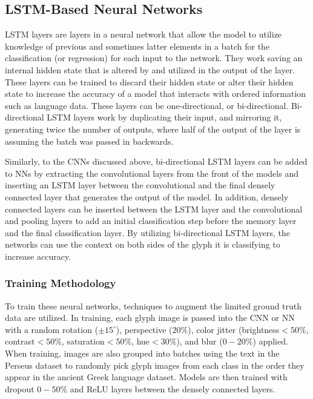 \subsection{LSTM-Based Neural Networks}

LSTM layers are layers in a neural network that allow the model to utilize knowledge of previous and sometimes latter elements in a batch for the classification (or regression) for each input to the network. They work saving an internal hidden state that is altered by and utilized in the output of the layer. These layers can be trained to discard their hidden state or alter their hidden state to increase the accuracy of a model that interacts with ordered information such as language data. These layers can be one-directional, or bi-directional. Bi-directional LSTM layers work by duplicating their input, and mirroring it, generating twice the number of outputs, where half of the output of the layer is assuming the batch was passed in backwards.

Similarly, to the CNNs discussed above, bi-directional LSTM layers can be added to NNs by extracting the convolutional layers from the front of the models and inserting an LSTM layer between the convolutional and the final densely connected layer that generates the output of the model. In addition, densely connected layers can be inserted between the LSTM layer and the convolutional and pooling layers to add an initial classification step before the memory layer and the final classification layer. By utilizing bi-directional LSTM layers, the networks can use the context on both sides of the glyph it is classifying to increase accuracy.

\subsubsection{Training Methodology}

To train these neural networks, techniques to augment the limited ground truth data are utilized. In training, each glyph image is passed into the CNN or NN with a random rotation ($\pm 15^\circ$), perspective ($20\%$), color jitter (brightness$<50\%$, contrast$<50\%$, saturation$<50\%$, hue$<30\%$), and blur ($0-20\%$) applied. When training, images are also grouped into batches using the text in the Perseus dataset to randomly pick glyph images from each class in the order they appear in the ancient Greek language dataset. Models are then trained with dropout $0-50\%$ and ReLU layers between the densely connected layers.

